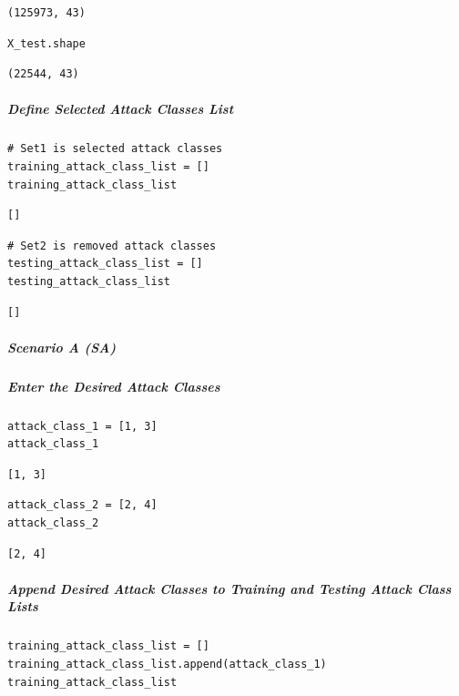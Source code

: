 \begin{verbatim}
(125973, 43)
\end{verbatim}

\begin{verbatim}
X_test.shape
\end{verbatim}

\begin{verbatim}
(22544, 43)
\end{verbatim}

\subparagraph{Define Selected Attack Classes List}

\begin{verbatim}
# Set1 is selected attack classes
training_attack_class_list = []
training_attack_class_list
\end{verbatim}

\begin{verbatim}
[]
\end{verbatim}

\begin{verbatim}
# Set2 is removed attack classes
testing_attack_class_list = []
testing_attack_class_list
\end{verbatim}

\begin{verbatim}
[]
\end{verbatim}

\subparagraph{Scenario A (SA)}

\subparagraph{Enter the Desired Attack Classes}

\begin{verbatim}
attack_class_1 = [1, 3]
attack_class_1
\end{verbatim}

\begin{verbatim}
[1, 3]
\end{verbatim}

\begin{verbatim}
attack_class_2 = [2, 4]
attack_class_2
\end{verbatim}

\begin{verbatim}
[2, 4]
\end{verbatim}

\subparagraph{Append Desired Attack Classes to Training and Testing Attack Class Lists}

\begin{verbatim}
training_attack_class_list = []
training_attack_class_list.append(attack_class_1)
training_attack_class_list
\end{verbatim}

